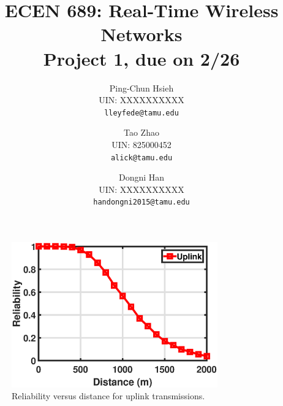 \documentclass{article}
\begin{document}
\title{ECEN 689: Real-Time Wireless Networks\\ Project 1, due on 2/26}
\date{}
\author{%
Ping-Chun Hsieh\\
UIN: XXXXXXXXXX\\
\texttt{lleyfede@tamu.edu}
\and
Tao Zhao\\
UIN: 825000452\\
\texttt{alick@tamu.edu}
\and
Dongni Han\\
UIN: XXXXXXXXXX\\
\texttt{handongni2015@tamu.edu}
}
\maketitle


\begin{figure}[h]
\centering
\includegraphics[width=3.5in]{p3_uplink.eps}
\caption{Reliability versus distance for uplink transmissions.}
\end{figure}
\end{document}
